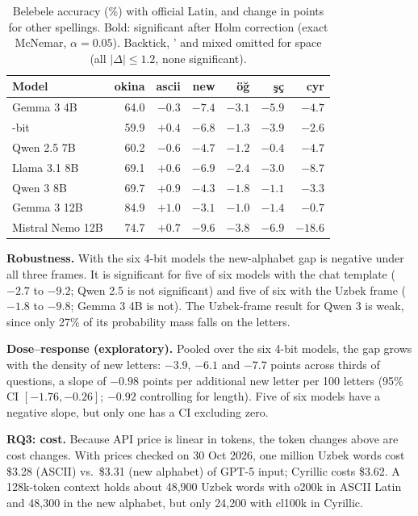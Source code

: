 \begin{table}[t]
\centering\small
\setlength{\tabcolsep}{3pt}
\begin{tabular}{lrrrrrr}
\toprule
Model & okina & ascii & new & \"o\u{g} & \c{s}\c{c} & cyr \\
\midrule
Gemma 3 4B & 64.0 & $-0.3$ & $\mathbf{-7.4}$ & $\mathbf{-3.1}$ & $\mathbf{-5.9}$ & $\mathbf{-4.7}$ \\
\quad 4-bit & 59.9 & $+0.4$ & $\mathbf{-6.8}$ & $-1.3$ & $\mathbf{-3.9}$ & $-2.6$ \\
Qwen 2.5 7B & 60.2 & $-0.6$ & $\mathbf{-4.7}$ & $-1.2$ & $-0.4$ & $\mathbf{-4.7}$ \\
Llama 3.1 8B & 69.1 & $+0.6$ & $\mathbf{-6.9}$ & $-2.4$ & $-3.0$ & $\mathbf{-8.7}$ \\
Qwen 3 8B & 69.7 & $+0.9$ & $\mathbf{-4.3}$ & $-1.8$ & $-1.1$ & $-3.3$ \\
Gemma 3 12B & 84.9 & $+1.0$ & $\mathbf{-3.1}$ & $-1.0$ & $-1.4$ & $-0.7$ \\
Mistral Nemo 12B & 74.7 & $+0.7$ & $\mathbf{-9.6}$ & $\mathbf{-3.8}$ & $\mathbf{-6.9}$ & $\mathbf{-18.6}$ \\
\bottomrule
\end{tabular}
\caption{Belebele accuracy (\%) with official Latin, and change in points for other spellings. Bold: significant after Holm correction (exact McNemar, $\alpha=0.05$). Backtick, \textquoteright{} and mixed omitted for space (all $|\Delta| \le 1.2$, none significant).}
\label{tab:acc}
\end{table}

\textbf{Robustness.} With the six 4-bit models the new-alphabet gap is negative under all three frames. It is significant for five of six models with the chat template ($-2.7$ to $-9.2$; Qwen 2.5 is not significant) and five of six with the Uzbek frame ($-1.8$ to $-9.8$; Gemma 3 4B is not). The Uzbek-frame result for Qwen 3 is weak, since only 27\% of its probability mass falls on the letters.

\textbf{Dose--response (exploratory).} Pooled over the six 4-bit models, the gap grows with the density of new letters: $-3.9$, $-6.1$ and $-7.7$ points across thirds of questions, a slope of $-0.98$ points per additional new letter per 100 letters (95\% CI $[-1.76, -0.26]$; $-0.92$ controlling for length). Five of six models have a negative slope, but only one has a CI excluding zero.

\textbf{RQ3: cost.} Because API price is linear in tokens, the token changes above are cost changes. With prices checked on 30 Oct 2026, one million Uzbek words cost \$3.28 (ASCII) vs.\ \$3.31 (new alphabet) of GPT-5 input; Cyrillic costs \$3.62. A 128k-token context holds about 48{,}900 Uzbek words with o200k in ASCII Latin and 48{,}300 in the new alphabet, but only 24{,}200 with cl100k in Cyrillic.

